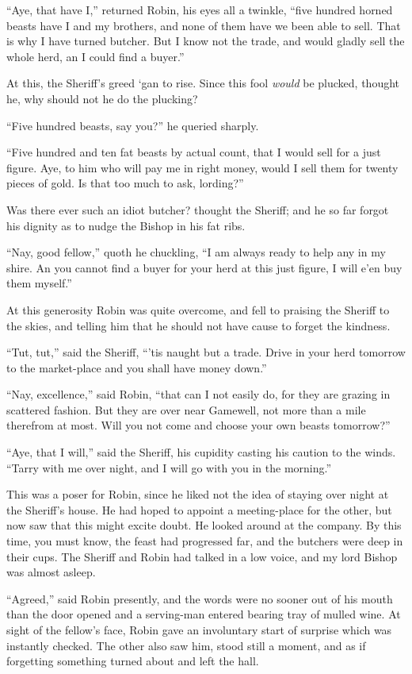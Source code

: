 ``Aye, that have I,'' returned Robin, his eyes all a twinkle, ``five
hundred horned beasts have I and my brothers, and none of them have we
been able to sell. That is why I have turned butcher. But I know not the
trade, and would gladly sell the whole herd, an I could find a buyer.''

At this, the Sheriff's greed `gan to rise. Since this fool \emph{would}
be plucked, thought he, why should not he do the plucking?

``Five hundred beasts, say you?'' he queried sharply.

``Five hundred and ten fat beasts by actual count, that I would sell for
a just figure. Aye, to him who will pay me in right money, would I sell
them for twenty pieces of gold. Is that too much to ask, lording?''

Was there ever such an idiot butcher? thought the Sheriff; and he so far
forgot his dignity as to nudge the Bishop in his fat ribs.

``Nay, good fellow,'' quoth he chuckling, ``I am always ready to help
any in my shire. An you cannot find a buyer for your herd at this just
figure, I will e'en buy them myself.''

At this generosity Robin was quite overcome, and fell to praising the
Sheriff to the skies, and telling him that he should not have cause to
forget the kindness.

``Tut, tut,'' said the Sheriff, ``'tis naught but a trade. Drive in your
herd tomorrow to the market-place and you shall have money down.''

``Nay, excellence,'' said Robin, ``that can I not easily do, for they
are grazing in scattered fashion. But they are over near Gamewell, not
more than a mile therefrom at most. Will you not come and choose your
own beasts tomorrow?''

``Aye, that I will,'' said the Sheriff, his cupidity casting his caution
to the winds. ``Tarry with me over night, and I will go with you in the
morning.''

This was a poser for Robin, since he liked not the idea of staying over
night at the Sheriff's house. He had hoped to appoint a meeting-place
for the other, but now saw that this might excite doubt. He looked
around at the company. By this time, you must know, the feast had
progressed far, and the butchers were deep in their cups. The Sheriff
and Robin had talked in a low voice, and my lord Bishop was almost
asleep.

``Agreed,'' said Robin presently, and the words were no sooner out of
his mouth than the door opened and a serving-man entered bearing tray of
mulled wine. At sight of the fellow's face, Robin gave an involuntary
start of surprise which was instantly checked. The other also saw him,
stood still a moment, and as if forgetting something turned about and
left the hall.

